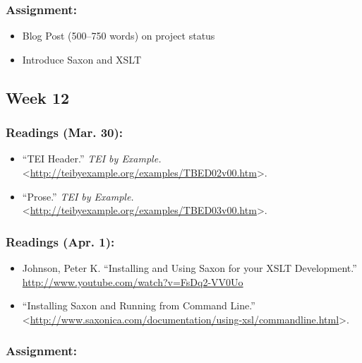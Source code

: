 \documentclass[]{article}
\begin{document}
\subsubsection{Assignment:}\label{assignment-5}

\begin{itemize}
\itemsep1pt\parskip0pt
\item
  Blog Post (500--750 words) on project status
\item
  Introduce Saxon and XSLT
\end{itemize}

\subsection{Week 12}\label{week-12}

\subsubsection{Readings (Mar. 30):}\label{readings-mar.-30}

\begin{itemize}
\itemsep1pt\parskip0pt
\item
  ``TEI Header.'' \emph{TEI by Example.}
  \textless{}\url{http://teibyexample.org/examples/TBED02v00.htm}\textgreater{}.
\item
  ``Prose.'' \emph{TEI by Example.}
  \textless{}\url{http://teibyexample.org/examples/TBED03v00.htm}\textgreater{}.
\end{itemize}

\subsubsection{Readings (Apr. 1):}\label{readings-apr.-1}

\begin{itemize}
\itemsep1pt\parskip0pt
\item
  Johnson, Peter K. ``Installing and Using Saxon for your XSLT
  Development.'' \url{http://www.youtube.com/watch?v=FsDq2-VV0Uo}
\item
  ``Installing Saxon and Running from Command Line.''
  \textless{}\url{http://www.saxonica.com/documentation/using-xsl/commandline.html}\textgreater{}.
\end{itemize}

\subsubsection{Assignment:}\label{assignment-6}
\end{document}
